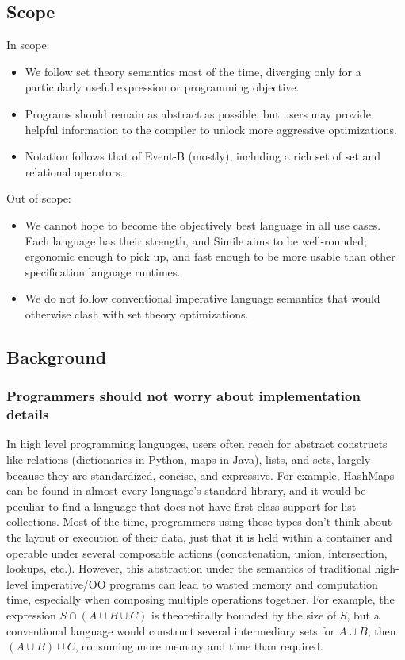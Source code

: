\subsection{Scope}
In scope:
\begin{itemize}
    \item We follow set theory semantics most of the time, diverging only for a particularly useful expression or programming objective.
    \item Programs should remain as abstract as possible, but users may provide helpful information to the compiler to unlock more aggressive optimizations.
    \item Notation follows that of Event-B (mostly), including a rich set of set and relational operators.
\end{itemize}
Out of scope:
\begin{itemize}
    \item We cannot hope to become the objectively best language in all use cases. Each language has their strength, and Simile aims to be well-rounded; ergonomic enough to pick up, and fast enough to be more usable than other specification language runtimes.
    \item We do not follow conventional imperative language semantics that would otherwise clash with set theory optimizations.
\end{itemize}

\subsection{Background}
\subsubsection{Programmers should not worry about implementation details}
In high level programming languages, users often reach for abstract constructs like relations (dictionaries in Python, maps in Java), lists, and sets, largely because they are standardized, concise, and expressive. For example, HashMaps can be found in almost every language's standard library, and it would be peculiar to find a language that does not have first-class support for list collections. Most of the time, programmers using these types don't think about the layout or execution of their data, just that it is held within a container and operable under several composable actions (concatenation, union, intersection, lookups, etc.). However, this abstraction under the semantics of traditional high-level imperative/OO programs can lead to wasted memory and computation time, especially when composing multiple operations together. For example, the expression $S \cap (A \cup B \cup C)$ is theoretically bounded by the size of $S$, but a conventional language would construct several intermediary sets for $A \cup B$, then $(A \cup B) \cup C$, consuming more memory and time than required.

